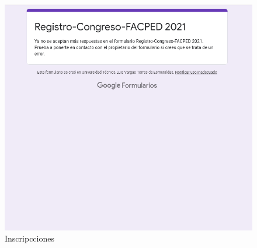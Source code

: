 \documentclass[a4paper,14px]{article}
\begin{document}
\begin{figure}[H]
  \centering
  \includegraphics[scale=0.6]{inscripcion.png}
  \caption{Inscripcciones}
  \label{fig:arquitectura}
\end{figure}
\end{document}

